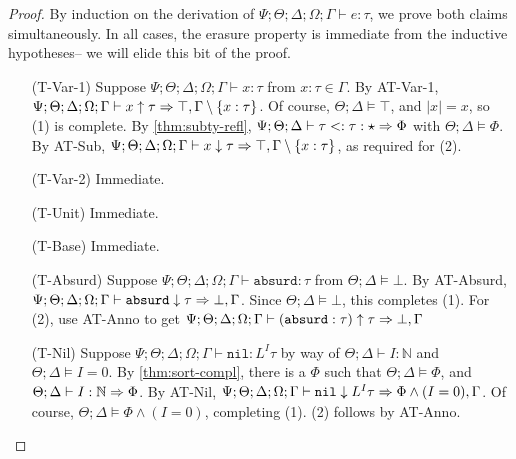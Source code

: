 \begin{proof}
By induction on the derivation of $\Psi;\Theta;\Delta;\Omega;\Gamma \vdash e : \tau$, we prove both claims simultaneously.
In all cases, the erasure property is immediate from the inductive hypotheses-- we will elide this bit of the proof.
\begin{itemize}
  \item[(T-Var-1)] Suppose $\Psi ; \Theta ; \Delta ; \Omega ; \Gamma \vdash x : \tau$ from $x : \tau \in \Gamma$. By AT-Var-1, $\Psi ; \Theta ; \Delta ; \Omega ; \Gamma \vdash x \uparrow \tau \Rightarrow \top,\Gamma \setminus \{x : \tau\}$. Of course, $\Theta ; \Delta \vDash \top$, and $|x| = x$, so (1) is complete. By \autoref{thm:subty-refl}, $\Psi ; \Theta ; \Delta \vdash \tau <: \tau : \star \Rightarrow \Phi$ with $\Theta ; \Delta \vDash \Phi$. By AT-Sub,  $\Psi ; \Theta ; \Delta ; \Omega ; \Gamma \vdash x \downarrow \tau \Rightarrow \top,\Gamma \setminus \{x : \tau\}$, as required for (2).
  
  \item[(T-Var-2)] Immediate.
  \item[(T-Unit)] Immediate.
  \item[(T-Base)] Immediate.
  \item[(T-Absurd)] Suppose $\Psi ; \Theta ; \Delta ; \Omega ; \Gamma \vdash \texttt{absurd} : \tau$ from $\Theta ; \Delta \vDash \bot$. By AT-Absurd,
  $\Psi ; \Theta ; \Delta ; \Omega ; \Gamma \vdash \texttt{absurd} \downarrow \tau \Rightarrow \bot,\Gamma$. Since $\Theta ; \Delta \vDash \bot$, this completes (1). For (2),
  use AT-Anno to get $\Psi ; \Theta ; \Delta ; \Omega ; \Gamma \vdash (\texttt{absurd} : \tau) \uparrow \tau \Rightarrow \bot,\Gamma$
  
  \item[(T-Nil)] Suppose $\Psi ; \Theta ; \Delta ; \Omega ; \Gamma\vdash \texttt{nil} : L^I \tau$ by way of
  $\Theta ; \Delta \vdash I : \mathbb{N}$ and
  $\Theta;\Delta \vDash I = 0$.
  By \autoref{thm:sort-compl}, there is a $\Phi$ such that
  $\Theta ; \Delta \vDash \Phi$, and
  $\Theta ; \Delta \vdash I : \mathbb{N} \Rightarrow \Phi$.
  By AT-Nil, $\Psi ; \Theta ; \Delta ; \Omega ; \Gamma\vdash \texttt{nil} \downarrow L^I \tau \Rightarrow \Phi \wedge (I = 0),\Gamma$.
  Of course, $\Theta ; \Delta \vDash \Phi \wedge (I = 0)$,
  completing (1). (2) follows by AT-Anno.
  

\end{itemize}
\end{proof}

